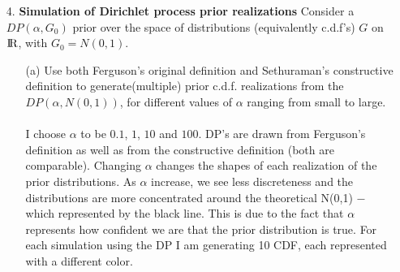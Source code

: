 \documentclass[a4paper, 10pt]{article}
\begin{document}
\begin{enumerate}
    \item[4.] \textbf{Simulation of Dirichlet process prior realizations} Consider a $DP(\alpha, G_0)$ prior over the space of distributions (equivalently c.d.f's) $G$ on ${\rm I\!R}$, with $G_0 = N(0,1)$.
    \begin{enumerate}
        \item[(a)]  Use both Ferguson’s original definition and Sethuraman’s constructive definition to generate(multiple) prior c.d.f.  realizations from the $DP(\alpha,N(0,1))$, for different values of $\alpha$ ranging from small to large.\\\\
         I choose $\alpha$ to be $0.1$, $1$, $10$ and $100$. DP's are drawn from Ferguson's definition as well as from the constructive definition (both are comparable). Changing $\alpha$ changes the shapes of each realization of the prior distributions. As $\alpha$ increase, we see less discreteness and the distributions are more concentrated around the theoretical N(0,1) $-$ which represented by the black line. This is due to the fact that $\alpha$ represents how confident we are that the prior distribution is true. For each simulation using the DP I am generating 10 CDF, each represented with a different color.
         \begin{center}
            \begin{figure}
                \centering

\end{figure}
\end{center}
\end{enumerate}
\end{enumerate}
\end{document}
